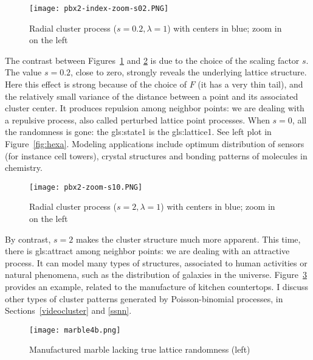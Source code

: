 \documentclass[10pt]{article}
\begin{document}
\begin{figure}[H]
\centering
\texttt{[image: pbx2-index-zoom-s02.PNG]}
\caption{Radial cluster process ($s=0.2, \lambda=1$) with centers in blue; zoom in on the left}
\label{fig:pbr4b}
\end{figure}

The contrast between Figures~\ref{fig:pbr4b} and \ref{fig:pbr} is due to the choice of the scaling factor $s$. The value $s=0.2$, close to zero,  strongly reveals the underlying lattice structure. Here this effect is strong because of  the choice of $F$ (it has a very thin tail), and the relatively small variance of the distance between a point and its associated cluster center.
It produces repulsion among neighbor points: we are dealing with a
\textcolor{index}{repulsive process}, also called \textcolor{index}{perturbed lattice point processes}. When $s=0$,  all the randomness
is gone: the \gls{gls:state1} is the \gls{gls:lattice1}. See left plot in Figure~\ref{fig:hexa}.  Modeling applications include
optimum distribution of sensors (for instance cell towers), crystal structures and bonding patterns of molecules in chemistry.


\begin{figure}[H]
\centering
\texttt{[image: pbx2-zoom-s10.PNG]}
\caption{Radial cluster process ($s=2, \lambda=1$) with centers in blue; zoom in on the left}
\label{fig:pbr}
\end{figure}

By contrast, $s=2$ makes the cluster structure much more apparent. This time, there is \gls{gls:attract} among neighbor points: we are dealing with an
\textcolor{index}{attractive process}. It can model many types of structures, associated to human activities or natural phenomena, such
as the distribution of galaxies in the universe. Figure~\ref{fig:quartz} provides an example, related to the manufacture of kitchen countertops. I discuss other types of
cluster patterns generated by Poisson-binomial processes, in Sections~\ref{videocluster} and \ref{ssnn}.


\begin{figure}[H]
\centering
\texttt{[image: marble4b.png]}
\caption{Manufactured marble lacking true lattice randomness (left)}
\label{fig:quartz}
\end{figure}
\end{document}
